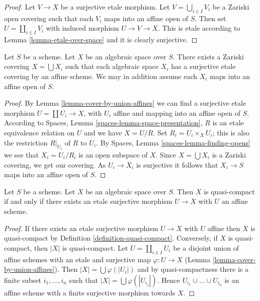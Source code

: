 \begin{proof}
Let $V \to X$ be a surjective etale morphism.
Let $V = \bigcup_{i \in I} V_i$ be a Zariski open covering
such that each $V_i$ maps into an affine open of $S$.
Then set $U = \coprod_{i \in I} V_i$ with induced morphism
$U \to V \to X$. This is etale according to
Lemma \ref{lemma-etale-over-space} and it is clearly surjective.
\end{proof}

\begin{lemma}
\label{lemma-union-of-quasi-compact}
Let $S$ be a scheme.
Let $X$ be an algebraic space over $S$.
There exists a Zariski covering $X = \bigcup X_i$
such that each algebraic space $X_i$ has a surjective
etale covering by an affine scheme. We may in addition assume
each $X_i$ maps into an affine open of $S$.
\end{lemma}

\begin{proof}
By Lemma \ref{lemma-cover-by-union-affines} we can find a surjective
etale morphism $U = \coprod U_i \to X$, with $U_i$ affine and mapping
into an affine open of $S$. According to
Spaces, Lemma \ref{spaces-lemma-space-presentation},
$R$ is an etale equivalence relation on $U$ and we have $X = U/R$. Set
$R_i = U_i \times_X U_i$; this is also the restriction $R|_{U_i}$ of $R$
to $U_i$. By
Spaces, Lemma \ref{spaces-lemma-finding-opens}
we see that $X_i = U_i/R_i$ is an open subspace of $X$. Since
$X = \bigcup X_i$ is a Zariski covering, we get our covering.
As $U_i \to X_i$ is surjective it follows that $X_i \to S$ maps into
an affine open of $S$.
\end{proof}

\begin{lemma}
\label{lemma-quasi-compact-affine-cover}
Let $S$ be a scheme.
Let $X$ be an algebraic space over $S$.
Then $X$ is quasi-compact if and only if
there exists an etale surjective morphism $U \to X$
with $U$ an affine scheme.
\end{lemma}

\begin{proof}
If there exists an etale surjective morphism $U \to X$ with $U$
affine then $X$ is quasi-compact by Definition \ref{definition-quasi-compact}.
Conversely, if $X$ is quasi-compact, then $|X|$ is quasi-compact.
Let $U = \coprod_{i \in I} U_i$ be a disjoint union of affine schemes
with an etale and surjective map $\varphi : U \to X$
(Lemma \ref{lemma-cover-by-union-affines}).
Then $|X| = \bigcup \varphi(|U_i|)$ and
by quasi-compactness there is a finite subset $i_1, \ldots, i_n$
such that $|X| = \bigcup \varphi(|U_{i_j}|)$. Hence
$U_{i_1} \cup \ldots \cup U_{i_n}$ is an affine scheme with a 
finite surjective morphism towards $X$.
\end{proof}

